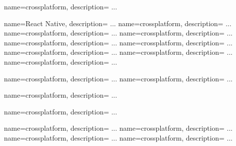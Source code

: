 
 {
  name=crossplatform,
  description={
		...
	}
}

 {
  name=React Native,
  description={
		...
	}
}
 {
  name=crossplatform,
  description={
		...
	}
}
 {
  name=crossplatform,
  description={
		...
	}
}
 {
  name=crossplatform,
  description={
		...
	}
}
 {
  name=crossplatform,
  description={
		...
	}
}
 {
  name=crossplatform,
  description={
		...
	}
}
 {
  name=crossplatform,
  description={
		...
	}
}
 {
  name=crossplatform,
  description={
		...
	}
}
 {
  name=crossplatform,
  description={
		...
	}
}

 {
  name=crossplatform,
  description={
		...
	}
}
 {
  name=crossplatform,
  description={
		...
	}
}

 {
  name=crossplatform,
  description={
		...
	}
}

 {
  name=crossplatform,
  description={
		...
	}
}

 {
  name=crossplatform,
  description={
		...
	}
}
 {
  name=crossplatform,
  description={
		...
	}
}
 {
  name=crossplatform,
  description={
		...
	}
}
 {
  name=crossplatform,
  description={
		...
	}
}


